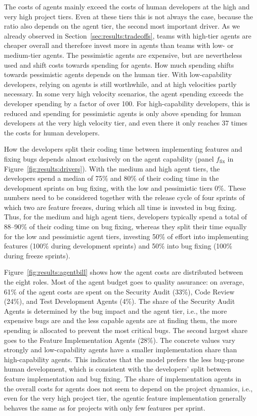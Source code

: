 \documentclass[smallextended]{svjour3}       %
\begin{document}
The costs of agents mainly exceed the costs of human developers at the high and very high project tiers. Even at these tiers this is not always the case, because the ratio also depends on the agent tier, the second most important driver. As we already observed in Section~\ref{sec:results:tradeoffs}, teams with high-tier agents are cheaper overall and therefore invest more in agents than teams with low- or medium-tier agents. The pessimistic agents are expensive, but are nevertheless used and shift costs towards spending for agents. How much spending shifts towards pessimistic agents depends on the human tier. With low-capability developers, relying on agents is still worthwhile, and at high velocities partly necessary. In some very high velocity scenarios, the agent spending exceeds the developer spending by a factor of over 100. For high-capability developers, this is reduced and spending for pessimistic agents is only above spending for human developers at the very high velocity tier, and even there it only reaches 37 times the costs for human developers. 

How the developers split their coding time between implementing features and fixing bugs depends almost exclusively on the agent capability (panel $f_\mathrm{fix}$ in Figure~\ref{fig:results:drivers}). With the medium and high agent tiers, the developers spend a median of 75\% and 80\% of their coding time in the development sprints on bug fixing, with the low and pessimistic tiers 0\%. These numbers need to be considered together with the release cycle of four sprints of which two are feature freezes, during which all time is invested in bug fixing. Thus, for the medium and high agent tiers, developers typically spend a total of 88--90\% of their coding time on bug fixing, whereas they split their time equally for the low and pessimistic agent tiers, investing 50\% of effort into implementing features (100\% during development sprints) and 50\% into bug fixing (100\% during freeze sprints). 

Figure~\ref{fig:results:agentbill} shows how the agent costs are distributed between the eight roles. Most of the agent budget goes to quality assurance: on average, 61\% of the agent costs are spent on the Security Audit (33\%), Code Review (24\%), and Test Development Agents (4\%). The share of the Security Audit Agents is determined by the bug impact and the agent tier, i.e., the more expensive bugs are and the less capable agents are at finding them, the more spending is allocated to prevent the most critical bugs. The second largest share goes to the Feature Implementation Agents (28\%). The concrete values vary strongly and low-capability agents have a smaller implementation share than high-capability agents. This indicates that the model prefers the less bug-prone human development, which is consistent with the developers' split between feature implementation and bug fixing. The share of implementation agents in the overall costs for agents does not seem to depend on the project dynamics, i.e., even for the very high project tier, the agentic feature implementation generally behaves the same as for projects with only few features per sprint. 
\end{document}
